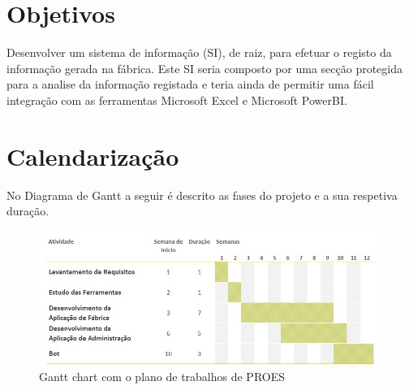 \section{Objetivos}
Desenvolver um sistema de informação (SI\label{sym:SI}), de raiz, para efetuar o registo da informação gerada na fábrica. Este SI seria composto por uma secção protegida para a analise da informação registada e teria ainda de permitir uma fácil integração com as ferramentas Microsoft Excel e Microsoft PowerBI.

\section{Calendarização}
No Diagrama de Gantt a seguir é descrito as fases do projeto e a sua respetiva duração.

\begin{figure}[htbp] 
    \begin{center}
    \includegraphics[width=\textwidth,keepaspectratio]{figuras/DiagramaGant.jpg}
    \caption{Gantt chart com o plano de trabalhos de PROES\label{sym:PROES}}\label{fig:gantt chart} 
    \end{center}
\end{figure}

